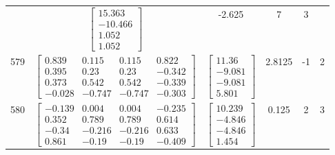 \documentclass[a4paper,12pt]{article}
\begin{document}
\begin{tabular}{c c c c c c}
&
$\begin{bmatrix} 15.363 \\ -10.466 \\ 1.052 \\ 1.052 \end{bmatrix}$
&
-2.625
&
7
&
3
\\
579
&
$\begin{bmatrix} 0.839 & 0.115 & 0.115 & 0.822 \\ 0.395 & 0.23 & 0.23 & -0.342 \\ 0.373 & 0.542 & 0.542 & -0.339 \\ -0.028 & -0.747 & -0.747 & -0.303 \end{bmatrix}$
&
$\begin{bmatrix} 11.36 \\ -9.081 \\ -9.081 \\ 5.801 \end{bmatrix}$
&
2.8125
&
-1
&
2
\\
580
&
$\begin{bmatrix} -0.139 & 0.004 & 0.004 & -0.235 \\ 0.352 & 0.789 & 0.789 & 0.614 \\ -0.34 & -0.216 & -0.216 & 0.633 \\ 0.861 & -0.19 & -0.19 & -0.409 \end{bmatrix}$
&
$\begin{bmatrix} 10.239 \\ -4.846 \\ -4.846 \\ 1.454 \end{bmatrix}$
&
0.125
&
2
&
3
\\
\end{tabular} \egroup \newpage
\end{document}
